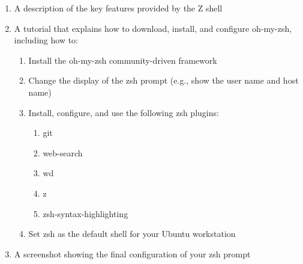 \begin{enumerate}
	
	\item A description of the key features provided by the Z shell

	\item A tutorial that explains how to download, install, and configure oh-my-zsh, including how to:

	  \begin{enumerate}

	    \item Install the oh-my-zsh community-driven framework

	    \item Change the display of the zsh prompt (e.g., show the user name and host name)

	    \item Install, configure, and use the following zsh plugins:

	      \begin{enumerate}

	        \item git
		  
		\item web-search

		\item wd 	

		\item z

		\item zsh-syntax-highlighting

	      \end{enumerate}

	    \item Set zsh as the default shell for your Ubuntu workstation

	  \end{enumerate}

	\item A screenshot showing the final configuration of your zsh prompt

\end{enumerate}



